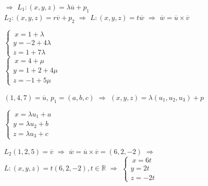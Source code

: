 \documentclass[secnumarabic,balancelastpage,amsmath,amssymb]{article}
\theoremstyle{remark}
\theoremstyle{definition}
\theoremstyle{prop}
\begin{document}
$\Rightarrow$ $L_{1}:(x,y,z)= \lambda \overline{u}+p_{1}$\\
$L_{2}:(x,y,z)= r\overline{v}+p_{2}$ $\Rightarrow$ $L:(x,y,z)= t\overline{w}$ $\Rightarrow$ $\overline{w}=\overline{u}\times \overline{v}$\\


\begin{multicols}{2}

$\left \{
      \begin{array}{rcl}
          \ x=1+\lambda\\
          y=-2+4\lambda \\ 
         z=1+7\lambda 
      \end{array}
   \right . $\\  
   
   $\left \{
      \begin{array}{rcl}
          \ x=4+\mu\\
          y=1+2+4\mu \\ 
         z=-1+5\mu 
      \end{array}
   \right . $\\   
   
  
   
   \end{multicols}
   
$(1,4,7)=\overline{u}$,  $p_{1}=(a,b,c)$ $\Rightarrow$ $(x,y,z)=\lambda(u_{1}, u_{2}, u_{3})+p $ \\

\begin{multicols}{2}
$\left \{
      \begin{array}{rcl}
          \ x=\lambda u_{1}+a\\
          y=\lambda u_{2}+b \\ 
         z=\lambda u_{3}+c
      \end{array}
   \right . $\\ 
   

   
 \end{multicols}   
 
 $L_{2} (1,2,5)=\overline{v}$ $\Rightarrow$ $\overline{w}=\overline{u}\times\overline{v}=(6,2,-2)$ $\Rightarrow$ $L:(x,y,z)=t(6,2,-2),t \in \mathbb {R}$
 $\Rightarrow$  $\left\{ 
      \begin{array}{rcl}
          \ x=6t\\
          y=2t\\ 
         z=-2t 
      \end{array}
   \right . $\\   
   
\end{document}

